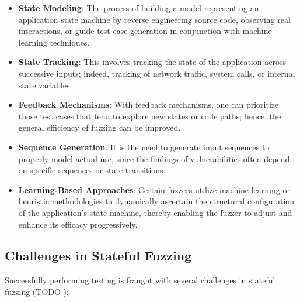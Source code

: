 \begin{itemize}
    \item \textbf{State Modeling}: The process of building a model representing an application state machine by reverse engineering source code, observing real interactions, or guide test case generation in conjunction with machine learning techniques.
    
    \item \textbf{State Tracking}: This involves tracking the state of the application across successive inputs; indeed, tracking of network traffic, system calls, or internal state variables.
    
    \item \textbf{Feedback Mechanisms}: With feedback mechanisms, one can prioritize those test cases that tend to explore new states or code paths; hence, the general efficiency of fuzzing can be improved.
    
    \item \textbf{Sequence Generation}: It is the need to generate input sequences to properly model actual use, since the findings of vulnerabilities often depend on specific sequences or state transitions.
    
    \item \textbf{Learning-Based Approaches}: Certain fuzzers utilize machine learning or heuristic methodologies to dynamically ascertain the structural configuration of the application's state machine, thereby enabling the fuzzer to adjust and enhance its efficacy progressively.
\end{itemize}

\subsection{Challenges in Stateful Fuzzing}
Successfully performing testing is fraught with several challenges in stateful fuzzing (TODO \cite{}):


